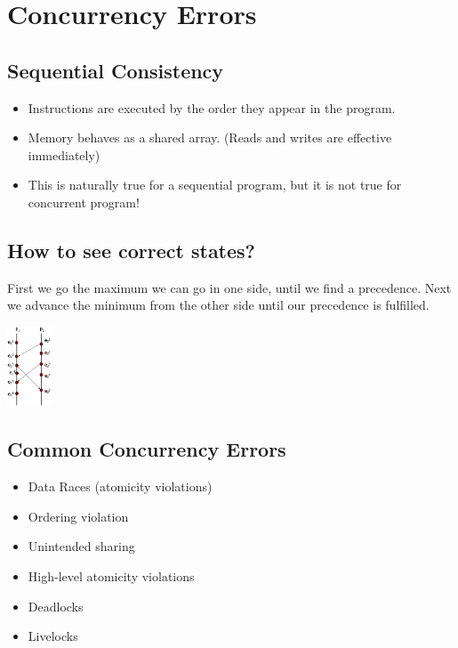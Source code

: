 \section{Concurrency Errors}

\subsection{Sequential Consistency}

\begin{itemize}
    \item Instructions are executed by the order they appear in the program.
    \item Memory behaves as a shared array. (Reads and writes are effective immediately)
    \item This is naturally true for a sequential program, but it is not true for concurrent program!
\end{itemize}

\subsection{How to see correct states?}

First we go the maximum we can go in one side, until we find a precedence. Next we advance the minimum from the other side until our precedence is fulfilled.


\includegraphics[width=0.1\textwidth]{ConcurrencyErrors/gRAPH.png}

\subsection{Common Concurrency Errors}

\begin{itemize}
    \item Data Races (atomicity violations)
    \item Ordering violation
    \item Unintended sharing
    \item High-level atomicity violations
    \item Deadlocks
    \item Livelocks
\end{itemize}

